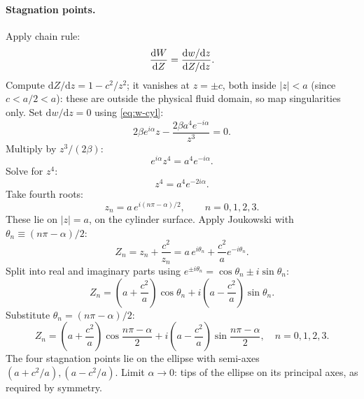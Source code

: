 \documentclass[11pt]{article}
\newcommand{\de}{\mathrm{d}}
\begin{document}
\paragraph{Stagnation points.} Apply chain rule:
\[ \dv{W}{Z} = \frac{\de w/\de z}{\de Z/\de z}. \]
Compute $\de Z/\de z = 1-c^{2}/z^{2}$; it vanishes at $z=\pm c$, both inside $|z|<a$ (since $c<a/2<a$): these are outside the physical fluid domain, so map singularities only.
Set $\de w/\de z=0$ using \eqref{eq:w-cyl}:
\[ 2\beta e^{i\alpha}z - \frac{2\beta a^{4}e^{-i\alpha}}{z^{3}} = 0. \]
Multiply by $z^{3}/(2\beta)$:
\[ e^{i\alpha}z^{4} = a^{4}e^{-i\alpha}. \]
Solve for $z^{4}$:
\[ z^{4} = a^{4}e^{-2i\alpha}. \]
Take fourth roots:
\[ z_n = a\,e^{i(n\pi-\alpha)/2},\qquad n=0,1,2,3. \]
These lie on $|z|=a$, on the cylinder surface. Apply Joukowski with $\theta_n\equiv(n\pi-\alpha)/2$:
\[ Z_n = z_n + \frac{c^{2}}{z_n} = a\,e^{i\theta_n} + \frac{c^{2}}{a}e^{-i\theta_n}. \]
Split into real and imaginary parts using $e^{\pm i\theta_n}=\cos\theta_n\pm i\sin\theta_n$:
\[ Z_n = \!\left(a+\frac{c^{2}}{a}\right)\!\cos\theta_n + i\!\left(a-\frac{c^{2}}{a}\right)\!\sin\theta_n. \]
Substitute $\theta_n=(n\pi-\alpha)/2$:
\begin{equation}
\boxed{\;Z_n = \!\left(a+\frac{c^{2}}{a}\right)\!\cos\!\frac{n\pi-\alpha}{2} + i\!\left(a-\frac{c^{2}}{a}\right)\!\sin\!\frac{n\pi-\alpha}{2},\quad n=0,1,2,3.\;}
\label{eq:Zn}
\end{equation}
The four stagnation points lie on the ellipse with semi-axes $(a+c^{2}/a),(a-c^{2}/a)$. Limit $\alpha\to 0$: tips of the ellipse on its principal axes, as required by symmetry.
\end{document}
